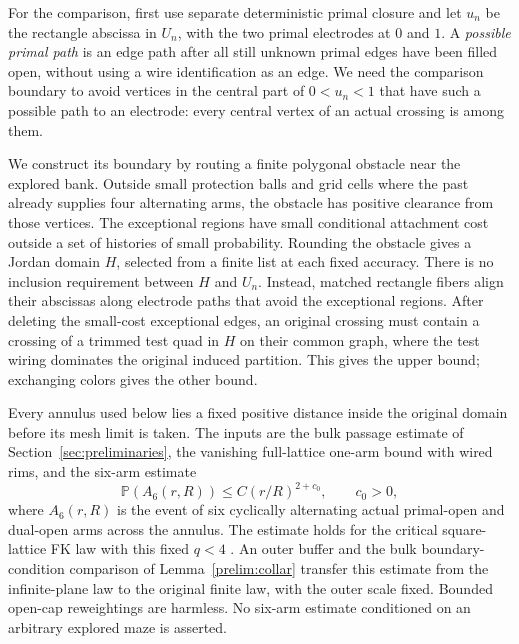 For the comparison, first use separate deterministic primal closure
and let $u_n$ be the rectangle abscissa in $U_n$, with the two primal
electrodes at $0$ and $1$.  A \emph{possible primal path} is an
edge path after all still unknown primal edges have been filled open,
without using a wire identification as an edge.  We need the comparison
boundary to avoid vertices in the central part of $0<u_n<1$ that have
such a possible path to an electrode: every central vertex of an actual
crossing is among them.

We construct its boundary by routing a finite polygonal obstacle near
the explored bank.  Outside small protection balls and grid cells where
the past already supplies four alternating arms, the obstacle has
positive clearance from those vertices.  The exceptional
regions have small conditional attachment cost outside a set of
histories of small probability.  Rounding the obstacle gives a Jordan
domain $H$, selected from a finite list at each fixed accuracy.  There
is no inclusion requirement between $H$ and $U_n$.  Instead, matched
rectangle fibers align their abscissas along electrode paths that
avoid the exceptional regions.  After deleting the small-cost
exceptional edges, an original
crossing must contain a crossing of a trimmed test quad in $H$ on
their common graph, where the test wiring dominates the original
induced partition.  This gives the upper bound; exchanging colors
gives the other bound.

Every annulus used below lies
a fixed positive distance inside the original domain before its mesh
limit is taken.  The inputs are the bulk passage estimate of
Section~\ref{sec:preliminaries}, the vanishing full-lattice one-arm
bound with wired rims, and the six-arm estimate
\begin{equation}\label{moving:sixarm}
 \mathbb P(A_6(r,R))\le C(r/R)^{2+c_0},\qquad c_0>0,
\end{equation}
where $A_6(r,R)$ is the event of six cyclically alternating actual
primal-open and dual-open arms across the annulus.  The estimate holds
for the critical square-lattice FK law with this fixed $q<4$
\cite[Corollary~6.7]{DMT2021Fractal}.  An outer buffer and the bulk
boundary-condition comparison of Lemma~\ref{prelim:collar} transfer
this estimate from the infinite-plane law to the original finite law,
with the outer scale fixed.  Bounded open-cap
reweightings are harmless.  No six-arm estimate conditioned on an
arbitrary explored maze is asserted.

